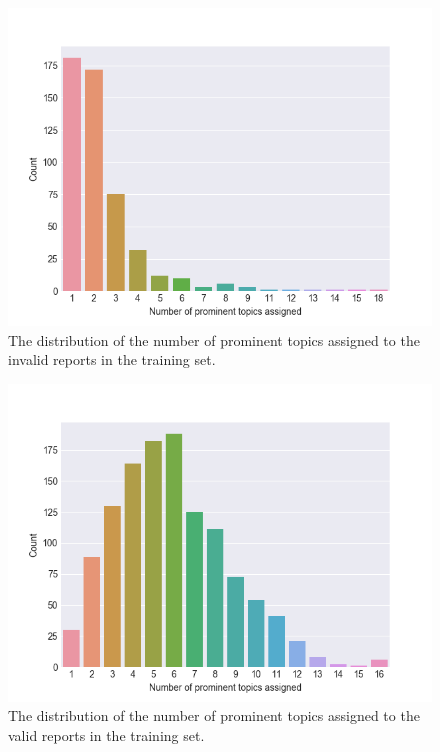 \begin{figure}
    \centering
    \includegraphics[scale=0.9]{figures/invalid_reports_prominent_topics_count_histogram}
    \caption{The distribution of the number of prominent topics assigned to the invalid reports in the training set.}
    \label{fig:invalid-reports-prominent-topic-count}
\end{figure}

\begin{figure}
    \centering
    \includegraphics[scale=0.9]{figures/valid_reports_prominent_topics_count_histogram}
    \caption{The distribution of the number of prominent topics assigned to the valid reports in the training set.}
    \label{fig:valid-reports-prominent-topic-count}
\end{figure}

